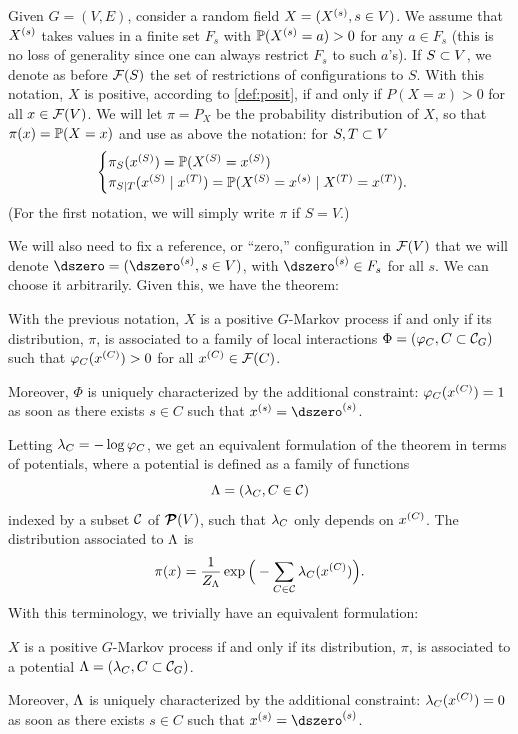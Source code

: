 Given $G=(V,E)$, consider a random field $X= (X^{(s)}, s\in
V)$. We assume that $X^{(s)}$ takes values in a finite set $F_s$ with
$\bm{\mathbb P}(X^{(s)}=a) > 0$ for any $a\in F_s$ (this is no loss of generality since
one can always restrict $F_s$ to such $a$'s). If $S\subset V$, we denote as before  ${\mathcal F}(S)$ the set of restrictions of configurations to $S$. With this
notation, $X$ is positive, according to  \cref{def:posit}, if and only if $P(X = x) >0$ for all
$x\in {\mathcal F}(V)$. We will let $\pi = P_X$ be the probability distribution
of $X$, so that $\pi(x)  = \bm{\mathbb P}(X = x)$ and use as above the  notation: for $S, T \subset V$
\begin{equation}
\label{eq:px}
\begin{cases}
\pi_S(x^{(S)}) = \bm{\mathbb P}(X^{(S)} = x^{(S)}) \\
 \pi_{S\mid T}(x^{(S)}\mid x^{(T)}) =
\bm{\mathbb P}(X^{(S)}=x^{(s)}\mid X^{(T)}= x^{(T)}).
\end{cases}
\end{equation}
(For the first notation, we will simply write $\pi$ if $S=V$.)

We will also need to fix a reference, or ``zero,'' configuration in ${\mathcal F}(V)$ that we will denote $\dszero = (\pe \dszero s, s\in V)$, with $\pe \dszero s\in F_s$ for all $s$. We can choose it arbitrarily.  Given this, we
have the theorem:
\begin{theorem}
\label{th:ham.clif.1}
With the previous notation, $X$ is a positive $G$-Markov process if
and only if its distribution, $\pi$, is associated to a family of local interactions $\Phi =
(\varphi_C, C\subset {\mathcal C}_G)$ such that $\varphi_C(x^{(C)}) > 0$ for all $x^{(C)}\in
{\mathcal F}(C)$.

Moreover, $\Phi$ is uniquely characterized by the additional
constraint: 
$\varphi_C(x^{(C)}) = 1$ as soon as there exists $s \in C$ such that $\pe xs = \pe \dszero s$. 
\end{theorem}

Letting $\lambda_C = -\log \varphi_C$, we get an equivalent formulation of the
theorem in terms of potentials, where a potential is defined as a
family of functions
\[
\Lambda = (\lambda_C, C\in {\mathcal C})
\]
indexed by a subset ${\mathcal C}$ of ${\bm{\mathcal P}({V})}$, such that $\lambda_C$ only
depends on $x^{(C)}$. The distribution
associated to $\Lambda$ is
\begin{equation}
\label{eq:pot.dec}
\pi(x) = \frac{1}{Z_\Lambda} \exp\Big(-\sum_{C\in {\mathcal C}}
\lambda_C(x^{(C)})\Big).
\end{equation}
With this terminology, we trivially have an equivalent formulation:
\begin{theorem}
\label{th:ham.clif}
$X$ is a positive $G$-Markov process if
and only if its distribution, $\pi$, is associated to a potential $\Lambda =
(\lambda_C, C\subset {\mathcal C}_G)$.

Moreover, $\Lambda$ is uniquely characterized by the additional
constraint:
$\lambda_C(x^{(C)}) = 0$ as soon as there exists $s \in C$ such that $\pe xs = \pe \dszero s$. 
\end{theorem}
 
